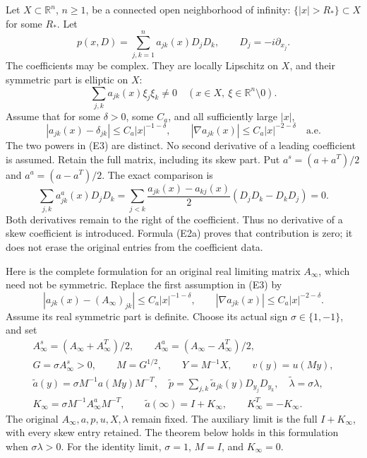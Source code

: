 \documentclass[
  11pt,
]{article}
\begin{document}
Let \(X\subset\mathbb R^n\), \(n\geq1\), be a connected open
neighborhood of infinity: \(\{|x|>R_*\}\subset X\) for some \(R_*\). Let
\[
 p(x,D)=\sum_{j,k=1}^n a_{jk}(x)D_jD_k,
 \qquad D_j=-i\partial_{x_j}.                                    \tag{E1}
\] The coefficients may be complex. They are locally Lipschitz on \(X\),
and their symmetric part is elliptic on \(X\): \[
 \sum_{j,k}a_{jk}(x)\xi_j\xi_k\ne0
 \quad(x\in X,\ \xi\in\mathbb R^n\setminus0).                   \tag{E2}
\] Assume that for some \(\delta>0\), some \(C_a\), and all sufficiently
large \(|x|\), \[
 |a_{jk}(x)-\delta_{jk}|\leq C_a|x|^{-1-\delta},
 \qquad |\nabla a_{jk}(x)|\leq C_a|x|^{-2-\delta}
 \quad\text{a.e.}                                                \tag{E3}
\] The two powers in (E3) are distinct. No second derivative of a
leading coefficient is assumed. Retain the full matrix, including its
skew part. Put \(a^s=(a+a^T)/2\) and \(a^a=(a-a^T)/2\). The exact
comparison is \[
 \sum_{j,k}a^a_{jk}(x)D_jD_k
 =\sum_{j<k}\frac{a_{jk}(x)-a_{kj}(x)}2
                  (D_jD_k-D_kD_j)=0.                         \tag{E2a}
\] Both derivatives remain to the right of the coefficient. Thus no
derivative of a skew coefficient is introduced. Formula (E2a) proves
that contribution is zero; it does not erase the original entries from
the coefficient data.

Here is the complete formulation for an original real limiting matrix
\(A_\infty\), which need not be symmetric. Replace the first assumption
in (E3) by \[
 |a_{jk}(x)-(A_\infty)_{jk}|\leq C_a|x|^{-1-\delta},
 \qquad |\nabla a_{jk}(x)|\leq C_a|x|^{-2-\delta}.                \tag{E3a}
\] Assume its real symmetric part is definite. Choose its actual sign
\(\sigma\in\{1,-1\}\), and set \[
 \begin{gathered}
 A_\infty^s=(A_\infty+A_\infty^T)/2,\qquad
 A_\infty^a=(A_\infty-A_\infty^T)/2,\\
 G=\sigma A_\infty^s>0,\qquad M=G^{1/2},\qquad
 Y=M^{-1}X,\qquad v(y)=u(My),\\
 \widetilde a(y)=\sigma M^{-1}a(My)M^{-T},\quad
 \widetilde p=\sum_{j,k}\widetilde a_{jk}(y)D_{y_j}D_{y_k},\quad
 \widetilde\lambda=\sigma\lambda,\\
 K_\infty=\sigma M^{-1}A_\infty^aM^{-T},\qquad
 \widetilde a(\infty)=I+K_\infty,\qquad K_\infty^T=-K_\infty.
 \end{gathered}                                                   \tag{E3b}
\] The original \(A_\infty,a,p,u,X,\lambda\) remain fixed. The auxiliary
limit is the full \(I+K_\infty\), with every skew entry retained. The
theorem below holds in this formulation when \(\sigma\lambda>0\). For
the identity limit, \(\sigma=1\), \(M=I\), and \(K_\infty=0\).
\end{document}
